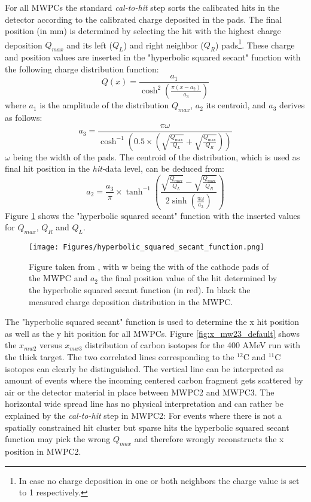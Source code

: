 \begin{appendices}
For all MWPCs the standard  \textit{cal-to-hit} step  sorts the calibrated hits in the detector according to the calibrated charge deposited in the pads. The final position (in mm) is determined by selecting the hit with the highest charge deposition $Q_{max}$ and its left ($Q_L$) and right neighbor ($Q_R$) pads\footnote{In case no charge deposition in one or both neighbors the charge value is set to 1 respectively.}. These charge and position values are inserted in the "hyperbolic squared secant" function \cite{lau1995optimization} with the following charge distribution function:
\[
Q(x) = \frac{a_1}{\cosh^2\left(\frac{\pi (x - a_2)}{a_3}\right)}
\]
\vspace{-0.5em} %
where \(a_1\) is the amplitude of the distribution $Q_{max}$, \(a_2\) its centroid, and \(a_3\) derives as follows:
\[
a_3 = \frac{\pi \omega}{\cosh^{-1}\left(0.5 \times \left(\sqrt{\frac{Q_{\text{max}}}{Q_L}} + \sqrt{\frac{Q_{\text{max}}}{Q_R}}\right)\right)}
\]
\vspace{-0.5em} %
\(\omega\) being the width of the pads. The centroid of the distribution, which is used as final hit position in the \textit{hit-}data level, can be deduced from:
\vspace{-0.5em} %
\[
a_2 = \frac{a_3}{\pi} \times \tanh^{-1}\left(\frac{\sqrt{\frac{Q_{\text{max}}}{Q_L}} - \sqrt{\frac{Q_{\text{max}}}{Q_R}}}{2 \sinh\left(\frac{\pi \omega}{a_3}\right)}\right)
\]
Figure \ref{fig:hyp_function} shows the "hyperbolic squared secant" function with the inserted values for $Q_{max}$, $Q_R$ and $Q_L$. 
\begin{figure}[htpb]
    \centering
    \texttt{[image: Figures/hyperbolic\_squared\_secant\_function.png]}
    \caption{
   	 Figure taken from \cite{martin2021fission}, with w being the with of the cathode pads of the MWPC and $a_2$ the final position value of the hit determined by the hyperbolic squared secant function (in red). In black the measured charge deposition distribution in the MWPC. 
     }
    \label{fig:hyp_function}
\end{figure}
The "hyperbolic squared secant" function is used to determine the x hit position as well as the y hit position for all MWPCs. Figure \ref{fig:x_mw23_default} shows the $x_{mw2}$ versus $x_{mw3}$ distribution of carbon isotopes for the 400 AMeV run with the thick target. The two correlated lines corresponding to the $^{12}$C and $^{11}$C isotopes can clearly be distinguished. The vertical line can be interpreted as amount of events where the incoming centered carbon fragment gets scattered by air or the detector material in place between MWPC2 and MWPC3. The horizontal wide spread line has no physical interpretation and can rather be explained by the \textit{cal-to-hit} step in MWPC2: For events where there is not a spatially constrained hit cluster but sparse hits the hyperbolic squared secant function may pick the wrong $Q_{max}$ and therefore wrongly reconstructs the x position in MWPC2. 

\end{appendices}
